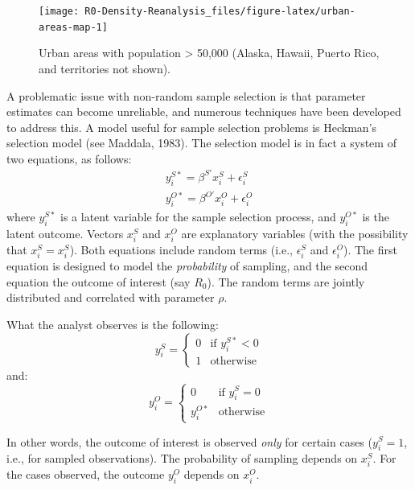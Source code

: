 \documentclass[]{elsarticle} %
\begin{document}
\begin{figure}
\texttt{[image: R0-Density-Reanalysis\_files/figure-latex/urban-areas-map-1]} \caption{\label{fig:urban-areas-map}Urban areas with population > 50,000 (Alaska, Hawaii, Puerto Rico, and territories not shown).}\label{fig:urban-areas-map}
\end{figure}

A problematic issue with non-random sample selection is that parameter
estimates can become unreliable, and numerous techniques have been
developed to address this. A model useful for sample selection problems
is Heckman's selection model (see Maddala, 1983). The selection model is
in fact a system of two equations, as follows: \[
\begin{array}{c}
y_i^{S*} = \beta^{S\prime}x_i^S+\epsilon_i^S\\
y_i^{O*} = \beta^{O\prime}x_i^O+\epsilon_i^O
\end{array}
\] \noindent where \(y_i^{S*}\) is a latent variable for the sample
selection process, and \(y_i^{O*}\) is the latent outcome. Vectors
\(x_i^S\) and \(x_i^O\) are explanatory variables (with the possibility
that \(x_i^S = x_i^S\)). Both equations include random terms (i.e.,
\(\epsilon_i^S\) and \(\epsilon_i^O\)). The first equation is designed
to model the \emph{probability} of sampling, and the second equation the
outcome of interest (say \(R_0\)). The random terms are jointly
distributed and correlated with parameter \(\rho\).

What the analyst observes is the following: \[
y_i^S =
\begin{cases}
0 & \text{if } y_i^{S*} < 0\\
1 & \text{otherwise}
\end{cases}
\] \noindent and: \[
y_i^O =
\begin{cases}
0 & \text{if } y_i^{S} = 0\\
y_i^{O*} & \text{otherwise}
\end{cases}
\]

In other words, the outcome of interest is observed \emph{only} for
certain cases (\(y_i^S=1\), i.e., for sampled observations). The
probability of sampling depends on \(x_i^S\). For the cases observed,
the outcome \(y_i^O\) depends on \(x_i^O\).
\end{document}
